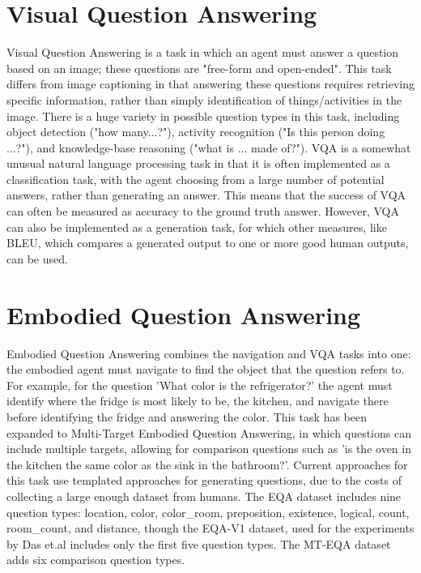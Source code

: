 \section{Visual Question Answering}
Visual Question Answering is a task in which an agent must answer a question based on an image; these questions are "free-form and open-ended"\cite{vqa_2015}. This task differs from image captioning in that answering these questions requires retrieving specific information, rather than simply identification %
of things/activities in the image. There is a huge variety in possible question types in this task, including object detection ("how many...?"), activity recognition ("Is this person doing ...?"), and knowledge-base reasoning ("what is ... made of?"). %
VQA is  a somewhat unusual natural language processing task in that it is often implemented as a classification task, with the agent choosing from a large number of potential answers, rather than generating an answer. %
This means that the success of VQA can often be measured as accuracy to the ground truth answer. However, VQA can also be implemented as a generation task, for which other measures, like BLEU, which compares a generated output to one or more good human outputs, can be used\cite{bleu}.
\section{Embodied Question Answering}
Embodied Question Answering combines the navigation and VQA tasks into one: the embodied agent must navigate to find the object that the question refers to\cite{embodiedqa}. For example, for the question 'What color is the refrigerator?' the agent must identify where the fridge is most likely to be, the kitchen, and navigate there before identifying the fridge and answering the color. This task has been expanded to Multi-Target Embodied Question Answering, in which questions can include multiple targets, allowing for comparison questions such as 'is the oven in the kitchen the same color as the sink in the bathroom?'\cite{eqa_multitarget}. Current approaches for this task use templated approaches for generating questions, due to the costs of collecting a large enough dataset from humans.  %
The EQA dataset includes nine question types: location, color, color\_room, preposition, existence, logical, count, room\_count, and distance, though the EQA-V1 dataset, used for the experiments by Das et.al includes only the first five question types\cite{embodiedqa}. The MT-EQA dataset adds six comparison question types\cite{eqa_multitarget}.

